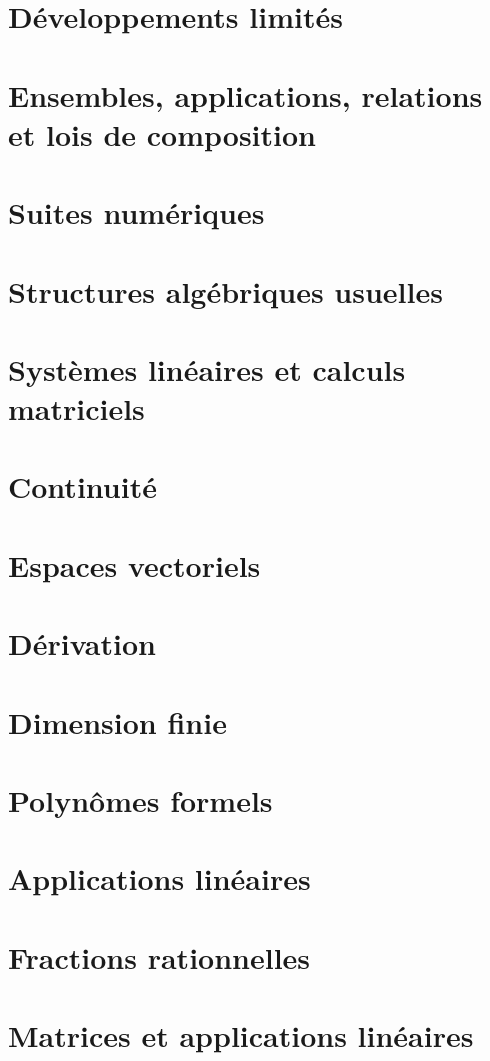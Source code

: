 \documentclass[a4paper]{report}
\newcommand{\chap}[2][0]{
	\setcounter{chapter}{#1 - 1}
	\chapter{#2}
	\renewcommand*\parttitle{#2}
}
\begin{document}
	\chap[07]{Développements limités}
	\renewcommand{\cwd}{../chap07}
	

	\chap[08]{Ensembles, applications, relations et lois de composition}
	\renewcommand{\cwd}{../chap08}
	
	
	

	\chap[11]{Suites numériques}
	\renewcommand{\cwd}{../chap11}
	
	
	
	
	
	
	
	

	\chap[12]{Structures algébriques usuelles}
	\renewcommand{\cwd}{../chap12}
	
	
	
	

	\chap[13]{Systèmes linéaires et calculs matriciels}
	\renewcommand{\cwd}{../chap13}
	

	\chap[14]{Continuité}
	\renewcommand{\cwd}{../chap14}
	
	
	
	

	\chap[15]{Espaces vectoriels}
	\renewcommand{\cwd}{../chap15}
	
	
	

	\chap[16]{Dérivation}
	\renewcommand{\cwd}{../chap16}
	
	
	
	

	\chap[17]{Dimension finie}
	\renewcommand{\cwd}{../chap17}
	

	\chap[18]{Polynômes formels}
	\renewcommand{\cwd}{../chap18}
	
	
	
	

	\chap[19]{Applications linéaires}
	\renewcommand{\cwd}{../chap19}
	
	
	
	
	

	\chap[20]{Fractions rationnelles}
	\renewcommand{\cwd}{../chap20}
	
	

	\chap[21]{Matrices et applications linéaires}
	\renewcommand{\cwd}{../chap21}
	
	
	
	
	
	
\end{document}
